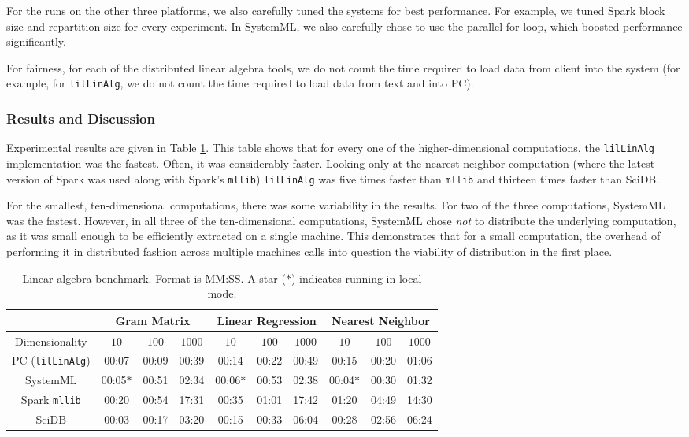 For the runs on the other three platforms, we also carefully tuned the
systems for best performance. For example, we tuned Spark block size and repartition
size for every experiment. In SystemML, we also carefully chose to
use the parallel for loop, which boosted performance significantly.

For fairness, for each of the distributed linear algebra tools, 
we do not count the time required to load data from client into the system
(for example, 
for \texttt{lilLinAlg}, we do not count the time required to load data from text and into PC).

\subsubsection {Results and Discussion}

Experimental results are given in 
Table \ref{fig:LR}. 
This table shows that for every one of the higher-dimensional computations, the 
\texttt{lilLinAlg} implementation was the fastest.  Often, it was considerably faster.
Looking only at the nearest neighbor computation (where the latest version of Spark was used
along with Spark's \texttt{mllib}) \texttt{lilLinAlg} was five times faster than \texttt{mllib}
and thirteen times faster than SciDB.  

For the smallest, ten-dimensional computations, there was some variability in the results.
For two of the three computations, 
SystemML was the fastest.  However, in all three of the ten-dimensional computations, SystemML chose
\emph{not} to distribute the underlying computation, as it was small enough to be efficiently extracted
on a single machine.  This demonstrates that for a small computation, the overhead of performing it in 
distributed fashion across multiple machines calls into question the viability of distribution in the first place.

\begin{table}[h!]
\small
\begin{center}
\begin{tabular}{|c||c|c|c||c|c|c||c|c|c||}
\hline
& \multicolumn{3}{c||}{Gram Matrix} & \multicolumn{3}{c||}{Linear Regression} & \multicolumn{3}{c||}{Nearest Neighbor} \\
\hline
Dimensionality & $10$ & $100$ & $1000$& $10$ & $100$ & $1000$& $10$ & $100$ & $1000$ \\
\hline
\hline
PC (\texttt{lilLinAlg}) &00:07 & 00:09 &00:39 &00:14 &00:22 &00:49& 00:15 & 00:20 & 01:06 \\
SystemML &00:05$*$ &00:51 &02:34 &00:06$*$ &00:53 &02:38 &00:04$*$ &00:30 &01:32 \\
Spark \texttt{mllib} &00:20  &00:54 &17:31 &00:35 &01:01 &17:42 &01:20 & 04:49 &14:30 \\
SciDB   &00:03 &00:17 &03:20 &00:15 &00:33 &06:04 &00:28 &02:56 & 06:24 \\
\hline
\end{tabular}
\caption{Linear algebra benchmark. Format is MM:SS.
A star ($*$) indicates running in local mode.}
\label{fig:LR}
\end{center}
\end{table}

